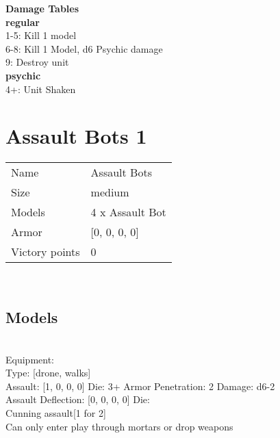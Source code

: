  





{\bf Damage Tables} \\
 {\bf regular } \\
1-5: Kill 1 model \\
6-8: Kill 1 Model, d6 Psychic damage \\
9: Destroy unit \\
 {\bf psychic } \\
4+: Unit Shaken \\










\pagebreak\pagebreak

\section{ Assault Bots 1 }

\begin{tabular}{ll}
  Name & Assault Bots \\
  Size & medium\\
  Models & 4 x Assault Bot\\
  Armor & [0, 0, 0, 0]\\
  Victory points & 0\\
\end{tabular}

\\ 


\subsection{ Models }

 \\
Equipment:  \\
Type: [drone, walks] \\

Assault: [1, 0, 0, 0] Die: 3+ Armor Penetration: 2 Damage: d6-2 \\
Assault Deflection: [0, 0, 0, 0] Die: \\
\indent Cunning assault[1 for 2]\\ 
 

Can only enter play through mortars or drop weapons\\ 


 





